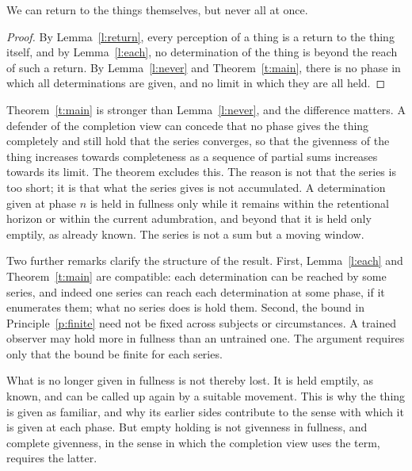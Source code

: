 \documentclass{situationist-preprint}
\begin{document}
\begin{corollary}\label{c:main}
We can return to the things themselves, but never all at once.
\end{corollary}

\begin{proof}
By Lemma~\ref{l:return}, every perception of a thing is a return to the thing itself, and by Lemma~\ref{l:each}, no determination of the thing is beyond the reach of such a return. By Lemma~\ref{l:never} and Theorem~\ref{t:main}, there is no phase in which all determinations are given, and no limit in which they are all held.
\end{proof}

Theorem~\ref{t:main} is stronger than Lemma~\ref{l:never}, and the difference matters. A defender of the completion view can concede that no phase gives the thing completely and still hold that the series converges, so that the givenness of the thing increases towards completeness as a sequence of partial sums increases towards its limit. The theorem excludes this. The reason is not that the series is too short; it is that what the series gives is not accumulated. A determination given at phase $n$ is held in fullness only while it remains within the retentional horizon or within the current adumbration, and beyond that it is held only emptily, as already known. The series is not a sum but a moving window.

Two further remarks clarify the structure of the result. First, Lemma~\ref{l:each} and Theorem~\ref{t:main} are compatible: each determination can be reached by some series, and indeed one series can reach each determination at some phase, if it enumerates them; what no series does is hold them. Second, the bound in Principle~\ref{p:finite} need not be fixed across subjects or circumstances. A trained observer may hold more in fullness than an untrained one. The argument requires only that the bound be finite for each series.

\begin{remark}\label{r:empty}
What is no longer given in fullness is not thereby lost. It is held emptily, as known, and can be called up again by a suitable movement. This is why the thing is given as familiar, and why its earlier sides contribute to the sense with which it is given at each phase. But empty holding is not givenness in fullness, and complete givenness, in the sense in which the completion view uses the term, requires the latter.
\end{remark}
\end{document}
